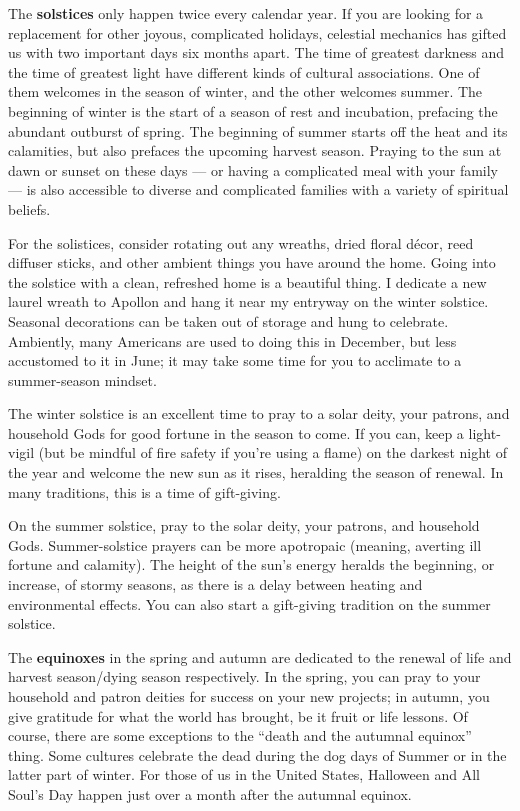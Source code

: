 \documentclass[
]{book}
\begin{document}
The \textbf{solstices} only happen twice every calendar year. If you are looking for a replacement for other joyous, complicated holidays, celestial mechanics has gifted us with two important days six months apart. The time of greatest darkness and the time of greatest light have different kinds of cultural associations. One of them welcomes in the season of winter, and the other welcomes summer. The beginning of winter is the start of a season of rest and incubation, prefacing the abundant outburst of spring. The beginning of summer starts off the heat and its calamities, but also prefaces the upcoming harvest season. Praying to the sun at dawn or sunset on these days --- or having a complicated meal with your family --- is also accessible to diverse and complicated families with a variety of spiritual beliefs.

For the solistices, consider rotating out any wreaths, dried floral décor, reed diffuser sticks, and other ambient things you have around the home. Going into the solstice with a clean, refreshed home is a beautiful thing. I dedicate a new laurel wreath to Apollon and hang it near my entryway on the winter solstice. Seasonal decorations can be taken out of storage and hung to celebrate. Ambiently, many Americans are used to doing this in December, but less accustomed to it in June; it may take some time for you to acclimate to a summer-season mindset.

The winter solstice is an excellent time to pray to a solar deity, your patrons, and household Gods for good fortune in the season to come. If you can, keep a light-vigil (but be mindful of fire safety if you're using a flame) on the darkest night of the year and welcome the new sun as it rises, heralding the season of renewal. In many traditions, this is a time of gift-giving.

On the summer solstice, pray to the solar deity, your patrons, and household Gods. Summer-solstice prayers can be more apotropaic (meaning, averting ill fortune and calamity). The height of the sun's energy heralds the beginning, or increase, of stormy seasons, as there is a delay between heating and environmental effects. You can also start a gift-giving tradition on the summer solstice.

The \textbf{equinoxes} in the spring and autumn are dedicated to the renewal of life and harvest season/dying season respectively. In the spring, you can pray to your household and patron deities for success on your new projects; in autumn, you give gratitude for what the world has brought, be it fruit or life lessons. Of course, there are some exceptions to the ``death and the autumnal equinox'' thing. Some cultures celebrate the dead during the dog days of Summer or in the latter part of winter. For those of us in the United States, Halloween and All Soul's Day happen just over a month after the autumnal equinox.
\end{document}
